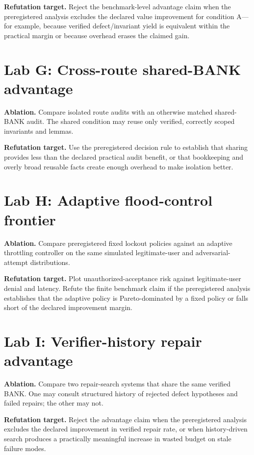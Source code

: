 \documentclass[11pt,openany]{book}
\theoremstyle{definition}
\theoremstyle{remark}
\begin{document}
\textbf{Refutation target.} Reject the benchmark-level advantage claim when the preregistered analysis excludes the declared value improvement for condition A---for example, because verified defect/invariant yield is equivalent within the practical margin or because overhead erases the claimed gain.

\section{Lab G: Cross-route shared-BANK advantage}
\textbf{Ablation.} Compare isolated route audits with an otherwise matched shared-BANK audit. The shared condition may reuse only verified, correctly scoped invariants and lemmas.

\textbf{Refutation target.} Use the preregistered decision rule to establish that sharing provides less than the declared practical audit benefit, or that bookkeeping and overly broad reusable facts create enough overhead to make isolation better.

\section{Lab H: Adaptive flood-control frontier}
\textbf{Ablation.} Compare preregistered fixed lockout policies against an adaptive throttling controller on the same simulated legitimate-user and adversarial-attempt distributions.

\textbf{Refutation target.} Plot unauthorized-acceptance risk against legitimate-user denial and latency. Refute the finite benchmark claim if the preregistered analysis establishes that the adaptive policy is Pareto-dominated by a fixed policy or falls short of the declared improvement margin.

\section{Lab I: Verifier-history repair advantage}
\textbf{Ablation.} Compare two repair-search systems that share the same verified BANK. One may consult structured history of rejected defect hypotheses and failed repairs; the other may not.

\textbf{Refutation target.} Reject the advantage claim when the preregistered analysis excludes the declared improvement in verified repair rate, or when history-driven search produces a practically meaningful increase in wasted budget on stale failure modes.
\end{document}
